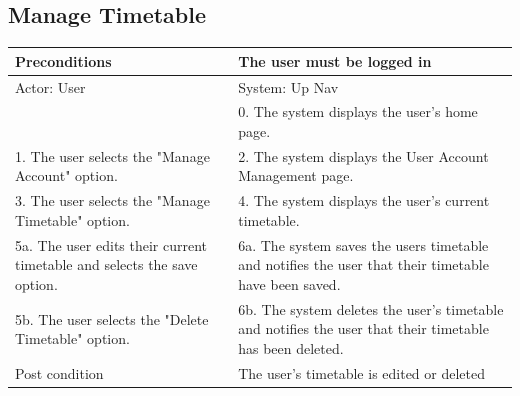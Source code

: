 \documentclass{article}
\begin{document}
\begin{enumerate}
	\subsection{Manage Timetable}
	\begin{tabular}{ | m{15em} | m{15em}| }
		\hline
		Preconditions                                                       				& The user must be logged in \\ 				
		\hline
		Actor: User                                                       					& System: Up Nav \\ 			
		\hline
                                                                  							& 0. The system displays the user's home page. \\                                                           
		 \hline
		1. The user selects the "Manage Account" option.				& 2. The system displays the User Account Management page. \\
		 \hline
		3. The user selects the "Manage Timetable" option. 				& 4.  The system displays the user's current timetable. \\
		\hline
		5a. The user edits their current timetable and selects the save option. 	& 6a. The system saves the users timetable and notifies the user that their timetable have been saved. \\ 
		\hline
		5b. The user selects the "Delete Timetable"  option.				&6b. The system deletes the user's timetable  and notifies the user that their timetable has been deleted. \\
		\hline
		Post condition                                                     				& The user's timetable is edited or deleted \\ 			
		\hline
	\end{tabular}




\end{enumerate}
\end{document}
